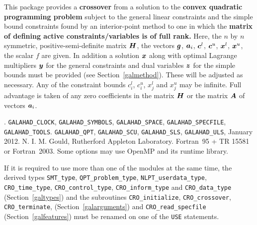 \documentclass{galahad}
\newcommand{\packagename}{CRO}
\newcommand{\fullpackagename}{\libraryname\_\packagename}
\begin{document}
\galheader


\galsummary
This package provides a {\bf crossover} from a solution
to the {\bf convex quadratic programming problem}
subject to the general linear constraints
and the simple bound constraints
found by an interior-point method to one in which the
{\bf matrix of defining
active constraints/variables is of full rank.}
Here, the $n$ by $n$ symmetric, positive-semi-definite matrix ${\bm{H}}$, the
vectors ${\bm{g}}$, ${\bm{a}}_{i}$, ${\bm{c}}^{l}$, ${\bm{c}}^{u}$, ${\bm{x}}^{l}$,
${\bm{x}}^{u}$, the scalar $f$ are given. In addition a solution ${\bm{x}}$ along
with optimal Lagrange multipliers ${\bm{y}}$ for the general constraints
and dual variables ${\bm{z}}$ for the simple bounds must be provided
(see Section~\ref{galmethod}).
These will be adjusted as necessary.
Any of the constraint bounds $c_{i}^{l}$, $c_{i}^{u}$,
$x_{j}^{l}$ and $x_{j}^{u}$ may be infinite.
Full advantage is taken of any zero coefficients in the matrix ${\bm{H}}$
or the matrix ${\bm{A}}$ of vectors ${\bm{a}}_{i}$.


\galattributes
\galversions{\tt  \fullpackagename\_single, \fullpackagename\_double}.
\galuses
{\tt GALAHAD\_CLOCK},
{\tt GALAHAD\_SY\-M\-BOLS},
{\tt GALAHAD\-\_SPACE},
{\tt GALAHAD\_\-SPECFILE},
{\tt GALAHAD\_TOOLS}.
{\tt GALAHAD\_QPT},
{\tt GALAHAD\_\-SCU},
{\tt GALAHAD\_\-SLS},
{\tt GALAHAD\_\-ULS},
\galdate January 2012.
\galorigin N. I. M. Gould, Rutherford Appleton Laboratory.
\gallanguage Fortran~95 + TR 15581 or Fortran~2003.
\galparallelism Some options may use OpenMP and its runtime library.


\galhowto




\noindent
If it is required to use more than one of the modules at the same time, 
the derived types
{\tt SMT\_type},
{\tt QPT\_problem\_type},
{\tt NLPT\_user\-data\-\_type},
{\tt \packagename\_time\_type},
{\tt \packagename\_control\_type},
{\tt \packagename\_inform\_type}
and
{\tt \packagename\_data\_type}
(Section~\ref{galtypes})
and the subroutines
{\tt \packagename\_initialize},
{\tt \packagename\_\-crossover},
{\tt \packagename\_terminate},
(Section~\ref{galarguments})
and
{\tt \packagename\_read\_specfile}
(Section~\ref{galfeatures})
must be renamed on one of the {\tt USE} statements.
\end{document}
